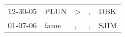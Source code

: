 \begin{supertabular}{lllll}
 12-30-05 &  PLUN &  \textgreater &  , &   DBK \\
 01-07-06 &  fame &             , &  , &  SJIM \\
\end{supertabular}
